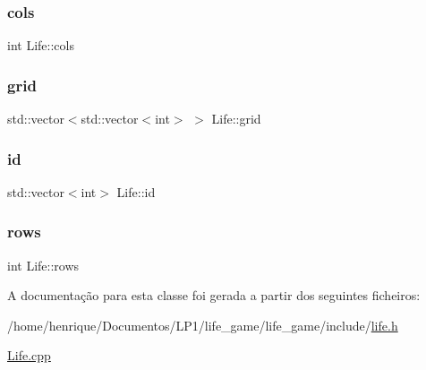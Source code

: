 \mbox{\label{classLife_a31a428734f7dc76ca386963139699ac6}} 
\subsubsection{\texorpdfstring{cols}{cols}}
{\footnotesize\ttfamily int Life\+::cols\hspace{0.3cm}{\ttfamily [private]}}

\mbox{\label{classLife_aeec163723c0c9aa1bc01483cd790210d}} 
\subsubsection{\texorpdfstring{grid}{grid}}
{\footnotesize\ttfamily std\+::vector$<$std\+::vector$<$int$>$ $>$ Life\+::grid\hspace{0.3cm}{\ttfamily [private]}}

\mbox{\label{classLife_ab33d6ee162673a71742a3df07a0a2e2f}} 
\subsubsection{\texorpdfstring{id}{id}}
{\footnotesize\ttfamily std\+::vector$<$int$>$ Life\+::id\hspace{0.3cm}{\ttfamily [private]}}

\mbox{\label{classLife_ab4d1ea4344ba31a4686f388edb7e2927}} 
\subsubsection{\texorpdfstring{rows}{rows}}
{\footnotesize\ttfamily int Life\+::rows\hspace{0.3cm}{\ttfamily [private]}}



A documentação para esta classe foi gerada a partir dos seguintes ficheiros\+:\begin{DoxyCompactItemize}
\item 
/home/henrique/\+Documentos/\+L\+P1/life\+\_\+game/life\+\_\+game/include/\hyperlink{life_8h}{life.\+h}\item 
\hyperlink{Life_8cpp}{Life.\+cpp}\end{DoxyCompactItemize}
